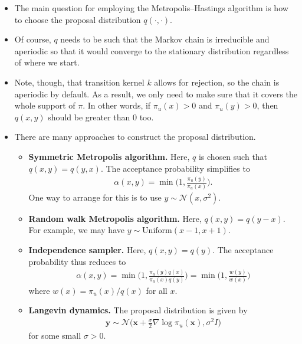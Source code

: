 \documentclass[10pt]{article}
\newcommand{\ve}[1]{\mathbf{#1}}
\newcommand{\mrm}[1]{\mathrm{#1}}
\newcommand{\mcal}[1]{\mathcal{#1}}
\begin{document}
\begin{itemize}
  \item The main question for employing the Metropolis--Hastings algorithm is how to choose the proposal distribution $q(\cdot, \cdot)$.
  
  \item Of course, $q$ needs to be such that the Markov chain is irreducible and aperiodic so that it would converge to the stationary distribution regardless of where we start.
    
  \item Note, though, that transition kernel $k$ allows for rejection, so the chain is aperiodic by default. As a result, we only need to make sure that it covers the whole support of $\pi$. In other words, if $\pi_u(x) > 0$ and $\pi_u(y) > 0$, then $q(x,y)$ should be greater than $0$ too.  

  \item There are many approaches to construct the proposal distribution.
  \begin{itemize}
    \item {\bf Symmetric Metropolis algorithm.} Here, $q$ is chosen such that $q(x,y) = q(y,x)$. The acceptance probability simplifies to
    \begin{align*}
      \alpha(x,y) = \min\bigg( 1, \frac{\pi_u(y)}{\pi_u(x)} \bigg).
    \end{align*}
    One way to arrange for this is to use $y \sim \mcal{N}(x, \sigma^2)$.

    \item {\bf Random walk Metropolis algorithm.} Here, $q(x,y) = q(y-x)$. For example, we may have $y \sim \mrm{Uniform}(x-1, x+1)$.
    
    \item {\bf Independence sampler.} Here, $q(x,y) = q(y)$. The acceptance probability thus reduces to
    \begin{align*}
      \alpha(x,y) 
      = \min\bigg( 1, \frac{\pi_u(y)q(x)}{\pi_u(x)q(y)} \bigg)
      = \min\bigg( 1, \frac{w(y)}{w(x)} \bigg)
    \end{align*}
    where $w(x) = \pi_u(x)/q(x)$ for all $x$.

    \item {\bf Langevin dynamics.} The proposal distribution is given by
    \begin{align*}
      \ve{y} \sim \mcal{N}\Big(\ve{x} + \frac{\sigma}{2} \nabla \log \pi_u(\ve{x}), \sigma^2 I \Big) 
    \end{align*}
    for some small $\sigma > 0$.    
  \end{itemize}


\end{itemize}
\end{document}
